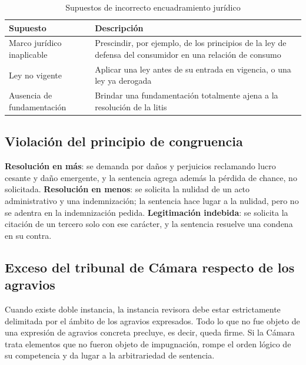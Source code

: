 \documentclass[12pt,oneside]{book}
\begin{document}
\begin{table}[H]
\centering
\caption{Supuestos de incorrecto encuadramiento jurídico}
\begin{tabularx}{\textwidth}{@{}lX@{}}
\toprule
\textbf{Supuesto} & \textbf{Descripción} \\
\midrule
Marco jurídico inaplicable & Prescindir, por ejemplo, de los principios de la ley
de defensa del consumidor en una relación de consumo \\
Ley no vigente & Aplicar una ley antes de su entrada en vigencia, o una ley ya
derogada \\
Ausencia de fundamentación & Brindar una fundamentación totalmente ajena a la
resolución de la litis \\
\bottomrule
\end{tabularx}
\end{table}

\subsection{Violación del principio de congruencia}

\begin{exbox}
\textbf{Resolución en más}: se demanda por daños y perjuicios reclamando lucro
cesante y daño emergente, y la sentencia agrega además la pérdida de chance, no
solicitada. \textbf{Resolución en menos}: se solicita la nulidad de un acto
administrativo y una indemnización; la sentencia hace lugar a la nulidad, pero no
se adentra en la indemnización pedida. \textbf{Legitimación indebida}: se solicita
la citación de un tercero solo con ese carácter, y la sentencia resuelve una
condena en su contra.
\end{exbox}

\subsection{Exceso del tribunal de Cámara respecto de los agravios}

\begin{impbox}
Cuando existe doble instancia, la instancia revisora debe estar estrictamente
delimitada por el ámbito de los agravios expresados. Todo lo que no fue objeto de
una expresión de agravios concreta precluye, es decir, queda firme. Si la Cámara
trata elementos que no fueron objeto de impugnación, rompe el orden lógico de su
competencia y da lugar a la arbitrariedad de sentencia.
\end{impbox}
\end{document}
